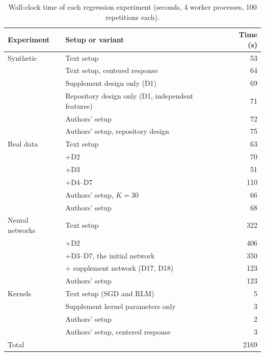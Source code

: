 \begin{table}[htbp]
\centering\small
\caption{Wall-clock time of each regression experiment (seconds, 4 worker processes, 100 repetitions each).}
\label{tab:compute}
\begin{tabular}{@{}llr@{}}
\toprule
Experiment & Setup or variant & Time (s) \\
\midrule
Synthetic & Text setup & 53 \\
 & Text setup, centered response & 64 \\
 & Supplement design only (D1) & 69 \\
 & Repository design only (D1, independent features) & 71 \\
 & Authors' setup & 72 \\
 & Authors' setup, repository design & 75 \\
\addlinespace
Real data & Text setup & 63 \\
 & +D2 & 70 \\
 & +D3 & 51 \\
 & +D4--D7 & 110 \\
 & Authors' setup, $K=30$ & 66 \\
 & Authors' setup & 68 \\
\addlinespace
Neural networks & Text setup & 322 \\
 & +D2 & 406 \\
 & +D3--D7, the initial network & 350 \\
 & + supplement network (D17, D18) & 123 \\
 & Authors' setup & 123 \\
\addlinespace
Kernels & Text setup (SGD and RLM) & 5 \\
 & Supplement kernel parameters only & 3 \\
 & Authors' setup & 2 \\
 & Authors' setup, centered response & 3 \\
\midrule
Total & & 2169 \\
\bottomrule
\end{tabular}
\end{table}
